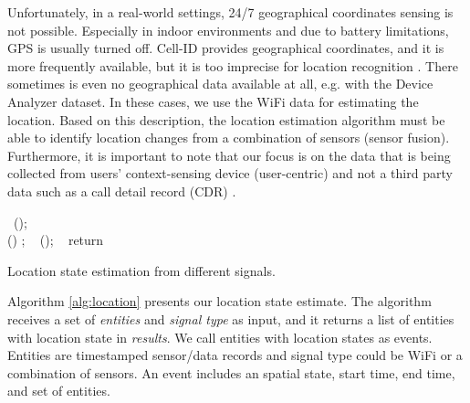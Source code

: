 \documentclass{sig-alternate}
\begin{document}
Unfortunately, in a real-world settings, 24/7 geographical coordinates sensing is not possible. Especially in indoor environments and due to battery limitations, GPS is usually turned off. Cell-ID provides geographical coordinates, and it is more frequently available, but it is too imprecise for location recognition \cite{enefpossmart}. There sometimes is even no geographical data available at all, e.g. with the Device Analyzer dataset. In these cases, we use the WiFi data for estimating the location. Based on this description, the location estimation algorithm must be able to identify location changes from a combination of sensors (sensor fusion). Furthermore, it is important to note that our focus is on the data that is being collected from users' context-sensing device (user-centric) and not a third party data such as a call detail record (CDR) \cite{hummob, idimpplpl}.\\
\vspace{-0.1cm}
 \begin{algorithm2e}[htb]
 \scriptsize 
 \KwData{,}
 \KwResult{}
 	 \If {( = )} {
			  { 
					 \textleftarrow\  (); \\
					\If {( != )} {
						() ; \
					} \ElseIf  {(  =  \& \\
				           () !=   )} {
							(); \
					} \Else {
						(); \
					}
				}  
			}	\Else { 
			 \ForAll { ( in ) }  { 
				 \textleftarrow\  (); \\
				\If	{( = )} {
					 \textleftarrow\  (); \
				}
				\If	{( = )} {
					() ; \
				}\ElseIf  {(  \&
				    () !=   )} { 
					(); \
			    } \Else {
			       (); \
			    }
			 }
		 }
 return  
\caption{\footnotesize Location state estimation from different signals.}  \label{alg:location}
\end{algorithm2e}
\normalsize
Algorithm \ref{alg:location} presents our location state estimate. The algorithm receives a set of \emph{entities} and \emph{signal type} as input, and it returns a list of entities with location state in \emph{results}. We call entities with location states as events. Entities are timestamped sensor/data records and signal type could be WiFi or a combination of sensors. An event includes an spatial state, start time, end time, and set of entities. \\
\end{document}

